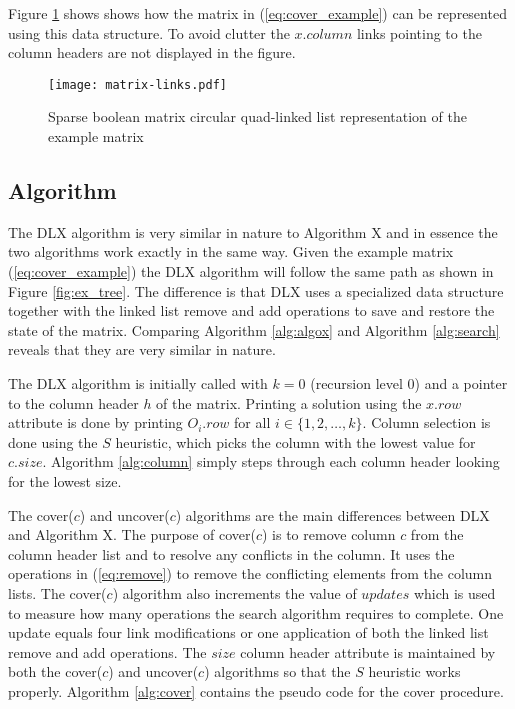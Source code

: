 Figure \ref{fig:matrix_links} shows shows how the matrix in (\ref{eq:cover_example}) can be represented using this data structure.
To avoid clutter the $x.column$ links pointing to the column headers are not displayed in the figure.
\begin{figure}[htbp]
	\centering
	\texttt{[image: matrix-links.pdf]}
	\caption{Sparse boolean matrix circular quad-linked list representation of the example matrix}
	\label{fig:matrix_links}
\end{figure}


\subsection{Algorithm}

The DLX algorithm is very similar in nature to Algorithm X and in essence the two algorithms work exactly in the same way.
Given the example matrix (\ref{eq:cover_example}) the DLX algorithm will follow the same path as shown in Figure \ref{fig:ex_tree}.
The difference is that DLX uses a specialized data structure together with the linked list remove and add operations to save and restore the state of the matrix.
Comparing Algorithm \ref{alg:algox} and Algorithm \ref{alg:search} reveals that they are very similar in nature.

The DLX algorithm is initially called with $k = 0$ (recursion level 0) and a pointer to the column header $h$ of the matrix.
Printing a solution using the $x.row$ attribute is done by printing $O_{i}.row$ for all $i \in \{1, 2, \ldots, k\}$.
Column selection is done using the $S$ heuristic, which picks the column with the lowest value for $c.size$.
Algorithm \ref{alg:column} simply steps through each column header looking for the lowest size.

The cover($c$) and uncover($c$) algorithms are the main differences between DLX and Algorithm X.
The purpose of cover($c$) is to remove column $c$ from the column header list and to resolve any conflicts in the column.
It uses the operations in (\ref{eq:remove}) to remove the conflicting elements from the column lists.
The cover($c$) algorithm also increments the value of $updates$ which is used to measure how many operations the search algorithm requires to complete.
One update equals four link modifications or one application of both the linked list remove and add operations.
The $size$ column header attribute is maintained by both the cover($c$) and uncover($c$) algorithms so that the $S$ heuristic works properly.
Algorithm \ref{alg:cover} contains the pseudo code for the cover procedure.


